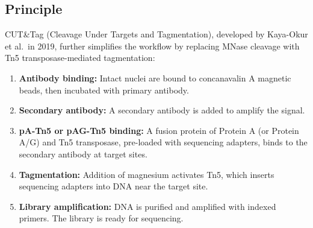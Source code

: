 \subsection{Principle}
\label{subsec:histones:cuttag-principle}

CUT\&Tag (Cleavage Under Targets and Tagmentation), developed by Kaya-Okur et al.\ in 2019, further simplifies the workflow by replacing MNase cleavage with Tn5 transposase-mediated tagmentation:

\begin{enumerate}[itemsep=2pt]
  \item \textbf{Antibody binding:} Intact nuclei are bound to concanavalin A magnetic beads, then incubated with primary antibody.
  \item \textbf{Secondary antibody:} A secondary antibody is added to amplify the signal.
  \item \textbf{pA-Tn5 or pAG-Tn5 binding:} A fusion protein of Protein A (or Protein A/G) and Tn5 transposase, pre-loaded with sequencing adapters, binds to the secondary antibody at target sites.
  \item \textbf{Tagmentation:} Addition of magnesium activates Tn5, which inserts sequencing adapters into DNA near the target site.
  \item \textbf{Library amplification:} DNA is purified and amplified with indexed primers. The library is ready for sequencing.
\end{enumerate}

